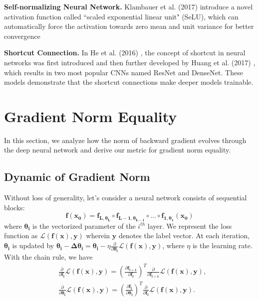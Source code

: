 \documentclass[10pt,journal,compsoc]{IEEEtran}
\begin{document}
\textbf{Self-normalizing Neural Network.} Klambauer et al. (2017) \cite{klambauer2017self} introduce a novel activation function called ``scaled exponential linear unit" (SeLU), which can automatically force the activation towards zero mean and unit variance for better convergence

\textbf{Shortcut Connection.} In He et al. (2016) \cite{he2016deep}, the concept of shortcut in neural networks was first introduced and then further developed by Huang et al. (2017) \cite{huang2017densely}, which results in two most popular CNNs named ResNet and DenseNet. These models demonstrate that the shortcut connections make deeper models trainable.
 
\section{Gradient Norm Equality}\label{sec:dynamic_of_}
In this section, we analyze how the norm of backward gradient evolves through the deep neural network and derive our metric for gradient norm equality.
\vspace{-10pt}
\subsection{Dynamic of Gradient Norm}

Without loss of generality, let's consider a neural network consists of sequential blocks: 
\begin{equation}
    \mathbf{f}(\mathbf{x_0}) = \mathbf{f_{L,\theta_L}}\circ \mathbf{f_{L-1,\theta_{L-1}}}\circ...\circ\mathbf{f_{1, \theta_1}}\left(\mathbf{x_0}\right)
\label{equ:series_block_network}
\end{equation}
where $\mathbf{\theta_i}$ is the vectorized parameter of the $i^{th}$ layer. We represent the loss function as $\mathcal{L}(\mathbf{f}(\mathbf{x}), \mathbf{y})$ wherein $\mathbf{y}$ denotes the label vector. At each iteration, $\mathbf{\theta_i}$ is updated by $\mathbf{\theta_i} -\mathbf{\Delta \theta_i} = \mathbf{\theta_i} - \eta\frac{\partial}{\partial \mathbf{\theta_i}}\mathcal{L}(\mathbf{f}(\mathbf{x}), \mathbf{y})$, where $\eta$ is the learning rate. With the chain rule, we have
\begin{equation}
    \begin{split}
        &\frac{\partial}{\partial \mathbf{f_{i}}}\mathcal{L}(\mathbf{f}(\mathbf{x}), \mathbf{y}) = \left(\frac{\partial \mathbf{f_{i+1}}}{\partial \mathbf{f_{i}}}\right)^T\frac{\partial}{\partial \mathbf{f_{i+1}}}\mathcal{L}(\mathbf{f}(\mathbf{x}), \mathbf{y}),\\
        &\frac{\partial}{\partial \mathbf{\theta_{i}}}\mathcal{L}(\mathbf{f}(\mathbf{x}), \mathbf{y}) = \left(\frac{\partial \mathbf{f_{i}}}{\partial \mathbf{\theta_{i}}}\right)^T \frac{\partial}{\partial \mathbf{f_{i}}}\mathcal{L}(\mathbf{f}(\mathbf{x}), \mathbf{y}).
    \end{split}
\end{equation}
\end{document}
